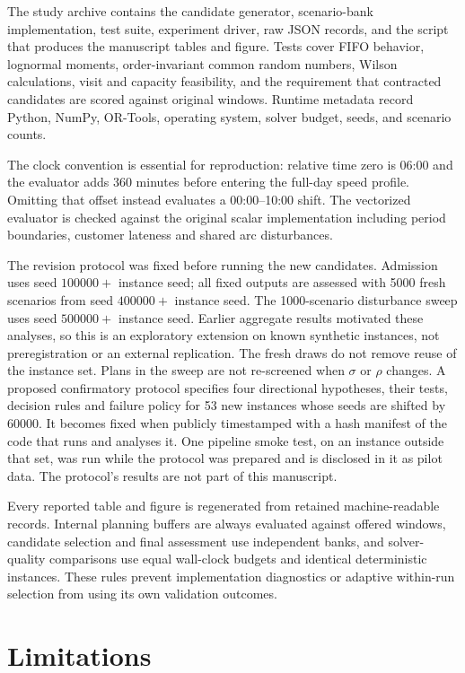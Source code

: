 \documentclass[11pt,a4paper]{article}
\begin{document}
The study archive contains the candidate generator, scenario-bank
implementation, test suite, experiment driver, raw JSON records, and the script
that produces the manuscript tables and figure. Tests cover FIFO behavior,
lognormal moments, order-invariant common random numbers, Wilson calculations,
visit and capacity feasibility, and the requirement that contracted candidates
are scored against original windows. Runtime metadata record Python, NumPy,
OR-Tools, operating system, solver budget, seeds, and scenario counts.

The clock convention is essential for reproduction: relative time zero is
06:00 and the evaluator adds 360 minutes before entering the full-day speed
profile. Omitting that offset instead evaluates a 00:00--10:00 shift. The
vectorized evaluator is checked against the original scalar implementation
including period boundaries, customer lateness and shared arc disturbances.

The revision protocol was fixed before running the new candidates. Admission
uses seed $100000+$ instance seed; all fixed outputs are assessed with 5000
fresh scenarios from seed $400000+$ instance seed. The 1000-scenario
disturbance sweep uses seed $500000+$ instance seed. Earlier aggregate results
motivated these analyses, so this is an exploratory extension on known
synthetic instances, not preregistration or an external replication. The
fresh draws do not remove reuse of the instance set. Plans in the sweep are
not re-screened when $\sigma$ or $\rho$ changes. A proposed
confirmatory protocol specifies four directional hypotheses, their tests,
decision rules and failure policy for 53 new instances whose seeds are shifted
by 60000. It becomes fixed when publicly timestamped with a hash manifest of
the code that runs and analyses it. One pipeline smoke test, on an instance
outside that set, was run while the protocol was prepared and is disclosed in
it as pilot data. The protocol's results are not part of this manuscript.

Every reported table and figure is regenerated from retained machine-readable
records. Internal planning buffers are always evaluated against offered
windows, candidate selection and final assessment use independent banks, and
solver-quality comparisons use equal wall-clock budgets and identical
deterministic instances. These rules prevent implementation diagnostics or
adaptive within-run selection from using its own validation outcomes.

\section{Limitations}
\end{document}
